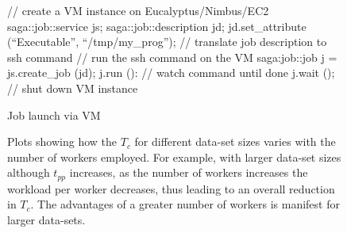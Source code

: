 \documentclass[conference,final]{IEEEtran}
\newcommand{\tc }{ $T_c$ }
\newcommand{\upp}{\vspace*{-0.5em}}
\newcommand{\ssh}[1]{\texttt{ssh}}
\begin{document}





\begin{figure}[!ht]
\upp
 \begin{center}
  \begin{mycode}[label=SAGA create a VM instance on a Cloud]
   {// create a VM instance on Eucalyptus/Nimbus/EC2
    saga::job::service     js;
    saga::job::description jd;
    jd.set_attribute (``Executable'', ``/tmp/my_prog'');
    // translate job description to ssh command
    // run the ssh command on the VM
    saga:job::job j = js.create_job (jd);
    j.run ():
    // watch command until done
    j.wait ();
   } // shut down VM instance
  \end{mycode}
  \caption{\label{vmjob} Job launch via VM}
 \end{center}
\upp
\end{figure}

\begin{figure}[t]
  \caption{Plots showing how the \tc for different data-set sizes
    varies with the number of workers employed.  For example, with
    larger data-set sizes although $t_{pp}$ increases, as the number
    of workers increases the workload per worker decreases, thus
    leading to an overall reduction in $T_c$. The advantages of a
    greater number of workers is manifest for larger data-sets.}
\label{grids1}
\end{figure}
\end{document}

